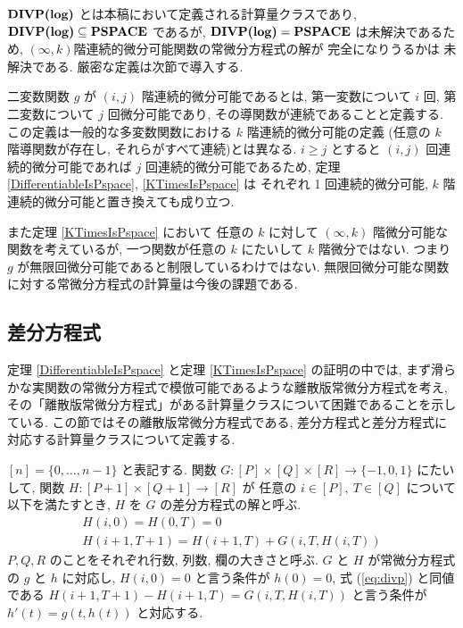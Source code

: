  $\text{\bf DIVP(log)}$ とは本稿において定義される計算量クラスであり,
 $\text{\bf DIVP(log)} \subseteq {\bf PSPACE}$ であるが, $\text{\bf DIVP(log)} = {\bf PSPACE}$ は未解決であるため,
 $(\infty, k)$階連続的微分可能関数の常微分方程式の解が \PSPACE 完全になりうるかは
 未解決である.
 厳密な定義は次節で導入する.

 二変数関数 $g$ が $(i, j)$ 階連続的微分可能であるとは,
 第一変数について $i$ 回, 第二変数について $j$ 回微分可能であり,
 その導関数が連続であることと定義する.
 この定義は一般的な多変数関数における $k$ 階連続的微分可能の定義
 (任意の $k$ 階導関数が存在し, それらがすべて連続)とは異なる.
 $i \ge j$ とすると $(i,j)$ 回連続的微分可能であれば $j$ 回連続的微分可能であるため,
 定理 \ref{DifferentiableIsPspace}, \ref{KTimesIsPspace} は
 それぞれ 1 回連続的微分可能, $k$ 階連続的微分可能と置き換えても成り立つ.

 また定理 \ref{KTimesIsPspace} において
 任意の $k$ に対して $(\infty, k)$ 階微分可能な関数を考えているが,
 一つ関数が任意の $k$ にたいして $k$ 階微分ではない.
 つまり $g$ が無限回微分可能であると制限しているわけではない. 
 無限回微分可能な関数に対する常微分方程式の計算量は今後の課題である.





\subsection{差分方程式}
\label{section:divp}

定理 \ref{DifferentiableIsPspace} と定理 \ref{KTimesIsPspace} の証明の中では,
まず滑らかな実関数の常微分方程式で模倣可能であるような離散版常微分方程式を考え, 
その「離散版常微分方程式」がある計算量クラスについて困難であることを示している.
この節ではその離散版常微分方程式である, 
差分方程式と差分方程式に対応する計算量クラスについて定義する.


$[n] = \{0, \dots , n-1\}$ と表記する.
関数 $G \colon [P] \times [Q] \times [R] \to \{-1, 0, 1\}$ にたいして,
関数 $H \colon [P + 1] \times [Q+1] \to [R]$ が
任意の $i \in [P],\ T \in [Q]$ について以下を満たすとき,
$H$ を $G$ の差分方程式の解と呼ぶ.
\begin{gather}
   H(i, 0) = H(0, T) = 0 
\\
   H(i + 1, T + 1) = H(i+1, T) + G(i, T, H(i, T))  \label{eq:divp}
\end{gather}
$P, Q, R$ のことをそれぞれ行数, 列数, 欄の大きさと呼ぶ.
$G$ と $H$ が常微分方程式の $g$ と $h$ に対応し,
$H(i, 0) = 0$ と言う条件が $h(0) = 0$,
式 (\ref{eq:divp}) と同値である $H(i + 1, T + 1) - H(i+1, T) = G(i, T, H(i, T))$
と言う条件が $h'(t) = g(t, h(t))$ と対応する.


